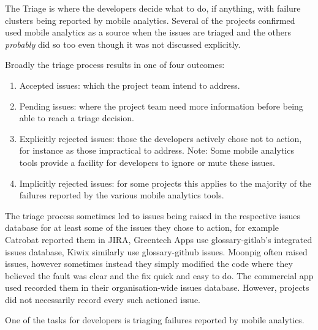 The Triage is where the developers decide what to do, if anything, with failure clusters being reported by mobile analytics. Several of the projects confirmed used mobile analytics as a source when the issues are triaged and the others \textit{probably} did so too even though it was not discussed explicitly.

Broadly the triage process results in one of four outcomes:
\begin{enumerate}
    \item Accepted issues: which the project team intend to address.
    \item Pending issues: where the project team need more information before being able to reach a triage decision.
    \item Explicitly rejected issues: those the developers actively chose not to action, for instance as those impractical to address. Note: Some mobile analytics tools provide a facility for developers to ignore or mute these issues.
    \item Implicitly rejected issues: for some projects this applies to the majority of the failures reported by the various mobile analytics tools.
\end{enumerate}

The triage process sometimes led to issues being raised in the respective issues database for at least some of the issues they chose to action, for example Catrobat reported them in JIRA, Greentech Apps use \Gls{glossary-gitlab}'s integrated issues database, Kiwix similarly use \gls{glossary-github} issues. Moonpig often raised issues, however sometimes instead they simply modified the code where they believed the fault was clear and the fix quick and easy to do. The commercial app used recorded them in their organisation-wide issues database. However, projects did not necessarily record every such actioned issue. 

One of the tasks for developers is triaging failures reported by mobile analytics. 

